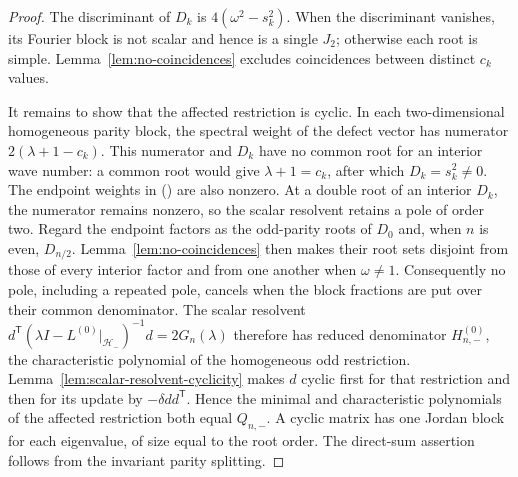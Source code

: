 \documentclass[twoside,10pt]{article}
\numberwithin{equation}{section}
\theoremstyle{slbody}
\theoremstyle{definition}
\theoremstyle{remark}
\renewcommand{\eqref}[1]{%
  \textup{{\normalfont(\oldstylenums{\ref{#1}}}\normalfont)}}
\begin{document}
\begin{proof}
The discriminant of $D_k$ is $4(\omega^2-s_k^2)$.  When the discriminant
vanishes, its Fourier block is not scalar and hence is a single
$J_2$; otherwise each root is simple.
Lemma~\ref{lem:no-coincidences} excludes coincidences between distinct
$c_k$ values.

It remains to show that the affected restriction is cyclic.  In each
two-dimensional homogeneous parity block, the spectral weight of the
defect vector has numerator $2(\lambda+1-c_k)$.  This numerator and
$D_k$ have no common root for an interior wave number: a common root
would give $\lambda+1=c_k$, after which $D_k=s_k^2\ne0$.  The endpoint
weights in \eqref{eq:Gfinite} are also nonzero.  At a double root of
an interior $D_k$, the numerator remains nonzero, so the scalar
resolvent retains a pole of order two.  Regard the endpoint factors as
the odd-parity roots of $D_0$ and, when $n$ is even, $D_{n/2}$.
Lemma~\ref{lem:no-coincidences} then makes their root sets disjoint from
those of every interior factor and from one another when $\omega\ne1$.
Consequently no pole, including a repeated pole, cancels when the block
fractions are put over their common denominator.  The scalar resolvent
$d^{\mathsf T}(\lambda I-L^{(0)}|_{\mathcal H_-})^{-1}d=2G_n(\lambda)$
therefore has reduced denominator $H_{n,-}^{(0)}$, the characteristic
polynomial of the homogeneous odd restriction.
Lemma~\ref{lem:scalar-resolvent-cyclicity} makes $d$ cyclic first for that
restriction and then for its update by $-\delta dd^{\mathsf T}$.  Hence
the minimal and characteristic polynomials of the affected restriction
both equal $Q_{n,-}$.  A cyclic matrix has one Jordan block for each
eigenvalue, of size equal to the root order.  The direct-sum assertion
follows from the invariant parity splitting.
\end{proof}
\end{document}
